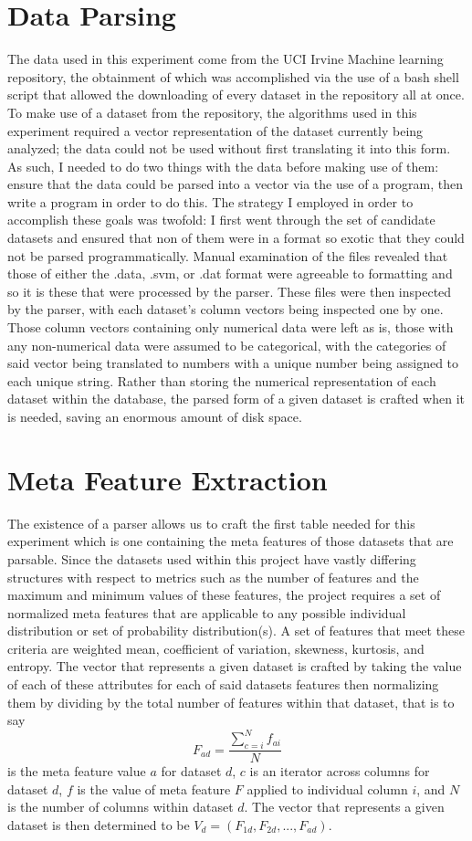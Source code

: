 \section{Data Parsing}
The data used in this experiment come from the UCI Irvine Machine learning
repository, the obtainment of which was accomplished via the use of a bash
shell script that allowed the downloading of every dataset in the repository
all at once. To make use of a dataset from the repository, the algorithms used
in this experiment required a vector representation of the dataset currently
being analyzed; the data could not be used without first translating it into
this form. As such, I needed to do two things with the data before making use
of them: ensure that the data could be parsed into a vector via the use of a program,
then write a program in order to do this. The strategy I employed in order to
accomplish these goals was twofold: I first went through the set of candidate
datasets and ensured that non of them were in a format so exotic that they could not
be parsed programmatically. Manual examination of the files revealed that those
of either the .data, .svm, or .dat format were agreeable to formatting and so it
is these that were processed by the parser. These files were then inspected by the
parser, with each dataset's column vectors being inspected one by one. Those
column vectors containing only numerical data were left as is, those with any
non-numerical data were assumed to be categorical, with the categories of said
vector being translated to numbers with a unique number being assigned to each
unique string. Rather than storing the numerical representation of each dataset
within the database, the parsed form of a given dataset is crafted when it is
needed, saving an enormous amount of disk space.

\section{Meta Feature Extraction}
The existence of a parser allows us to craft the first table needed for this
experiment which is one containing the meta features of those datasets that are
parsable. Since the datasets used within this project have vastly
differing structures with respect to metrics such as the number of features
and the maximum and minimum values of these features, the project requires a set
of normalized meta features that are applicable to any possible individual
distribution or set of probability distribution(s). A set of features that meet
these criteria are weighted mean, coefficient of variation, skewness, kurtosis, and
entropy. The vector that represents a given dataset is crafted by taking the
value of each of these attributes for each of said datasets features then
normalizing them by dividing by the total number of features within that dataset,
that is to say
$$F_{ad} = \frac{\sum_{c=i}^{N}f_{ai}}{N}$$
is the meta feature value $a$ for dataset $d$, $c$ is an iterator across columns
for dataset $d$, $f$ is the value of meta feature $F$ applied to individual
column $i$, and $N$ is the number of columns within dataset $d$. The vector that
represents a given dataset is then determined to be
$V_d = (F_{1d}, F_{2d},..., F_{ad})$.


